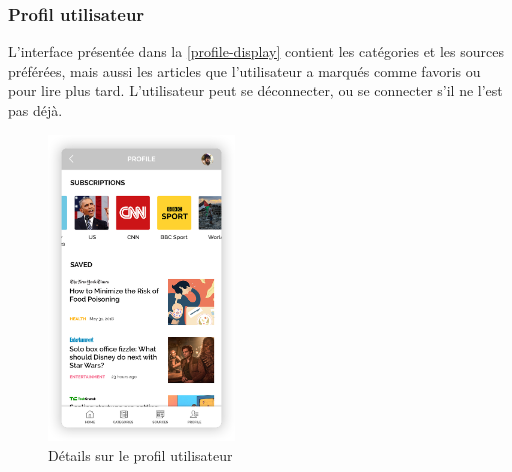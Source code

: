 \subsubsection{Profil utilisateur}
L'interface présentée dans la \autoref{profile-display} contient les catégories et les sources préférées, mais aussi les articles que l'utilisateur a marqués comme favoris ou pour lire plus tard. L'utilisateur peut se déconnecter, ou se connecter s'il ne l'est pas déjà.
\begin{figure}[H]
    \centering
    \includegraphics[width=140pt]{img/chapter4/feedny/en-profile.png}
    \caption{Détails sur le profil utilisateur}
    \label{profile-display}
\end{figure}

